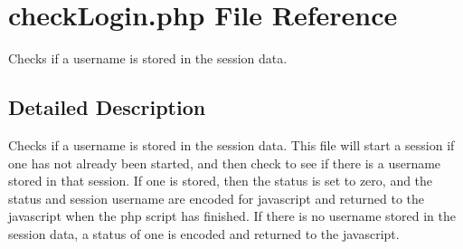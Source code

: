 \hypertarget{check_login_8php}{\section{check\-Login.\-php \-File \-Reference}
\label{check_login_8php}
}


\-Checks if a username is stored in the session data.  




\subsection{\-Detailed \-Description}
\-Checks if a username is stored in the session data. \-This file will start a session if one has not already been started, and then check to see if there is a username stored in that session. \-If one is stored, then the status is set to zero, and the status and session username are encoded for javascript and returned to the javascript when the php script has finished. \-If there is no username stored in the session data, a status of one is encoded and returned to the javascript. 